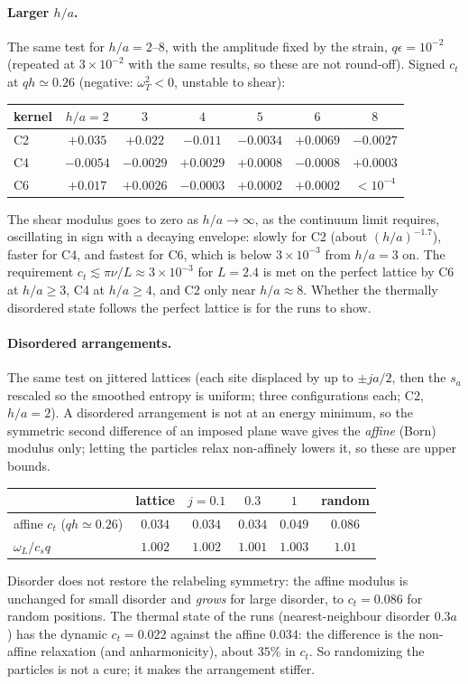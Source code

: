 \documentclass[11pt,aps,preprint,nofootinbib,superscriptaddress,tightenlines]{revtex4-2}
\let\oldparagraph\paragraph
\renewcommand{\paragraph}{\par\bigskip\oldparagraph}
\begin{document}
\paragraph{Larger $h/a$.}  The same test for $h/a=2$--$8$, with the amplitude fixed by the strain,
$q\epsilon=10^{-2}$ (repeated at $3\times10^{-2}$ with the same results, so these are not
round-off).  Signed $c_t$ at $qh\simeq0.26$ (negative: $\omega_T^2<0$, unstable to shear):
\begin{center}
\begin{tabular}{lcccccc}
\hline
kernel & $h/a=2$ & $3$ & $4$ & $5$ & $6$ & $8$ \\ \hline
C2 & $+0.035$ & $+0.022$ & $-0.011$ & $-0.0034$ & $+0.0069$ & $-0.0027$ \\
C4 & $-0.0054$ & $-0.0029$ & $+0.0029$ & $+0.0008$ & $-0.0008$ & $+0.0003$ \\
C6 & $+0.017$ & $+0.0026$ & $-0.0003$ & $+0.0002$ & $+0.0002$ & $<10^{-4}$ \\
\hline
\end{tabular}
\end{center}
The shear modulus goes to zero as $h/a\to\infty$, as the continuum limit requires, oscillating
in sign with a decaying envelope: slowly for C2 (about $(h/a)^{-1.7}$), faster for C4, and
fastest for C6, which is below $3\times10^{-3}$ from $h/a=3$ on.  The requirement
$c_t\lesssim\pi\nu/L\approx3\times10^{-3}$ for $L=2.4$ is met on the perfect lattice by C6 at
$h/a\ge3$, C4 at $h/a\ge4$, and C2 only near $h/a\approx8$.  Whether the thermally disordered
state follows the perfect lattice is for the runs to show.

\paragraph{Disordered arrangements.}  The same test on jittered lattices (each site displaced
by up to $\pm ja/2$, then the $s_a$ rescaled so the smoothed entropy is uniform; three
configurations each; C2, $h/a=2$).  A disordered arrangement is not at an energy minimum, so
the symmetric second difference of an imposed plane wave gives the \emph{affine} (Born)
modulus only; letting the particles relax non-affinely lowers it, so these are upper bounds.
\begin{center}
\begin{tabular}{lccccc}
\hline
 & lattice & $j=0.1$ & $0.3$ & $1$ & random \\ \hline
affine $c_t$ ($qh\simeq0.26$) & $0.034$ & $0.034$ & $0.034$ & $0.049$ & $0.086$ \\
$\omega_L/c_sq$ & $1.002$ & $1.002$ & $1.001$ & $1.003$ & $1.01$ \\
\hline
\end{tabular}
\end{center}
Disorder does not restore the relabeling symmetry: the affine modulus is unchanged for small
disorder and \emph{grows} for large disorder, to $c_t=0.086$ for random positions.  The thermal
state of the runs (nearest-neighbour disorder $0.3a$) has the dynamic $c_t=0.022$ against the
affine $0.034$: the difference is the non-affine relaxation (and anharmonicity), about $35\%$
in $c_t$.  So randomizing the particles is not a cure; it makes the arrangement stiffer.
\end{document}
